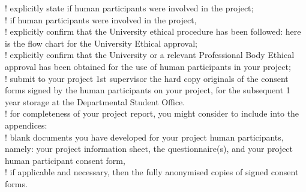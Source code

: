 ! explicitly state if human participants were involved in the project; \\
! if human participants were involved in the project, \\
! explicitly confirm that the University ethical procedure has been
followed: here is the flow chart for the University Ethical
approval; \\
! explicitly confirm that the University or a relevant Professional
Body Ethical approval has been obtained for the use of human
participants in your project; \\
! submit to your project 1st supervisor the hard copy originals of
the consent forms signed by the human participants on your
project, for the subsequent 1 year storage at the Departmental
Student Office. \\
! for completeness of your project report, you might consider to
include into the appendices: \\
! blank documents you have developed for your project
human participants, namely: your project information
sheet, the questionnaire(s), and your project human
participant consent form, \\
! if applicable and necessary, then the
fully anonymised copies of signed consent forms. \\